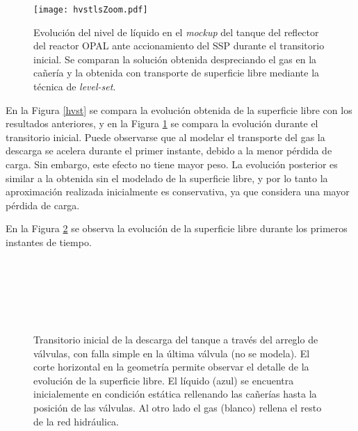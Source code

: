 \begin{figure}[ht]
\centering
\texttt{[image: hvstlsZoom.pdf]}
\caption[Evolución del nivel de líquido en el \textit{mockup} del tanque del reflector del reactor OPAL ante accionamiento del SSP]
{Evolución del nivel de líquido en el \textit{mockup} del tanque del reflector del reactor OPAL ante accionamiento del SSP durante el transitorio inicial.
  Se comparan la solución obtenida despreciando el gas en la cañería y la obtenida con transporte de superficie libre mediante la técnica de \textit{level-set}.}  
	\label{hvstls}
\end{figure}

En la Figura \ref{hvst} se compara la evolución obtenida de la superficie libre con los resultados anteriores,
y en la Figura \ref{hvstls} se compara la evolución durante el transitorio inicial.
Puede observarse que al modelar el transporte del gas la descarga se acelera durante el primer instante, debido a la menor pérdida de carga.
Sin embargo, este efecto no tiene mayor peso.
La evolución posterior es similar a la obtenida sin el modelado de la superficie libre,
y por lo tanto la aproximación realizada inicialmente es conservativa, ya que considera una mayor pérdida de carga.


En la Figura \ref{evol-ls} se observa la evolución de la superficie libre durante los primeros instantes de tiempo.

\begin{figure}[h]
\begin{minipage}[t]{.48\textwidth}
\centering
{}\\
\\
\end{minipage}\hfill
\begin{minipage}[t]{.48\textwidth}
\centering
{}\\
\\
\end{minipage}
\caption[Transitorio inicial de la descarga del tanque a través del arreglo de válvulas del \textit{mockup} del reactor OPAL, con detalle de la evolución de la superficie libre]
{Transitorio inicial de la descarga del tanque a través del arreglo de válvulas, con falla simple en la última válvula
  (no se modela).
	El corte horizontal en la geometría permite observar el detalle de la evolución de la superficie libre.
  El líquido (azul) se encuentra inicialemente en condición estática rellenando las cañerías hasta la posición de las válvulas.
  Al otro lado el gas (blanco) rellena el resto de la red hidráulica.}  
\label{evol-ls}
\end{figure}

